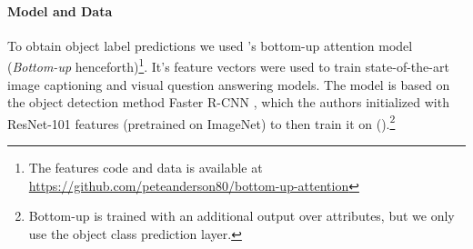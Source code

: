 \paragraph{Model and Data}
To obtain object label predictions we used \citeauthor{anderson2018updown}'s \citeyear{anderson2018updown} bottom-up attention model (\textit{Bottom-up} henceforth)\footnote{The features code and data is available at \url{https://github.com/peteanderson80/bottom-up-attention}}. 
It's feature vectors were used to train state-of-the-art image captioning and visual question answering models. 
The model is based on the object detection method Faster R-CNN \cite{fasterrcnn2015}, which the authors  initialized with ResNet-101 \cite{he2016deep} features (pretrained on ImageNet) to then train it on \vgenome (\vg).\footnote{Bottom-up is trained with an additional output over attributes, but we only use the object class prediction layer.} 
%
\iffalse
"To pretrain the bottom-up attention model, we first initialize Faster R-CNN with ResNet-101 pretrained for classification on ImageNet [35]. We then train on Visual
Genome [21] data. To aid the learning of good feature
representations, we add an additional training output for
predicting attribute classes (in addition to object classes).
To predict attributes for region i, we concatenate the mean
pooled convolutional feature vi with a learned embedding
of the ground-truth object class, and feed this into an additional output layer defining a softmax distribution over each
attribute class plus a ‘no attributes’ class.
The original Faster R-CNN multi-task loss function contains four components, defined over the classification and
bounding box regression outputs for both the RPN and the
final object class proposals respectively. We retain these
components and add an additional multi-class loss component to train the attribute predictor"
\fi

